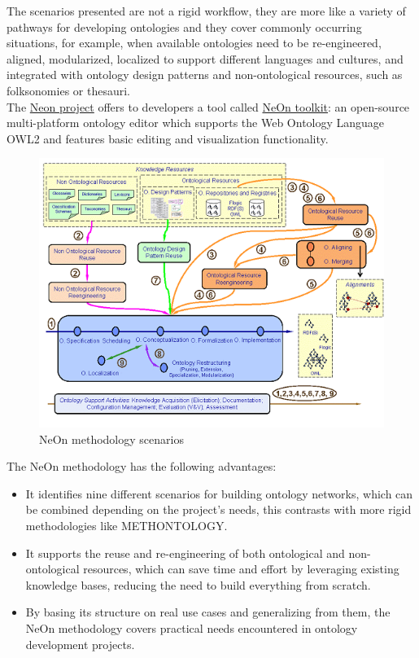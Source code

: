 The scenarios presented are not a rigid workflow, they are more like a variety of pathways for developing ontologies and they  cover commonly occurring situations, for example, when available ontologies need to be re-engineered, aligned, modularized, localized to support different languages and cultures, and integrated with ontology design patterns and non-ontological resources, such as folksonomies or thesauri.\cite{suarez2011neon}\\

The \href{http://neon-project.org/nw/Welcome_to_the_NeOn_Project.html}{Neon project} offers to developers a tool called \href{http://neon-toolkit.org/wiki/Main_Page.html}{NeOn toolkit}: an open-source multi-platform ontology editor which supports the Web Ontology Language OWL2 and features basic editing and visualization functionality.\cite{erdmann2011overview}\\
\begin{figure}[H]
    \centering
    \includegraphics[width=0.5\linewidth]{Figures/fig_2.png}
    \caption{NeOn methodology scenarios}
    \label{fig:enter-label}
\end{figure}
The NeOn methodology has the following advantages:
\begin{itemize}
    \item It identifies nine different scenarios for building ontology networks, which can be combined depending on the project’s needs, this contrasts with more rigid methodologies like METHONTOLOGY.

    \item It supports the reuse and re-engineering of both ontological and non-ontological resources, which can save time and effort by leveraging existing knowledge bases, reducing the need to build everything from scratch.

    \item By basing its structure on real use cases and generalizing from them, the NeOn methodology covers practical needs encountered in ontology development projects.
\end{itemize}
